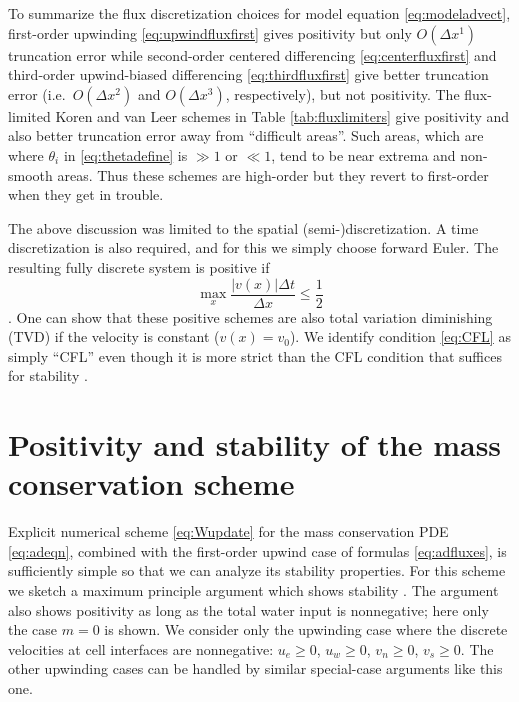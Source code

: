 \documentclass[11pt,final]{amsart}
\begin{document}
To summarize the flux discretization choices for model equation \eqref{eq:modeladvect}, first-order upwinding \eqref{eq:upwindfluxfirst} gives positivity but only $O(\Delta x^1)$ truncation error while second-order centered differencing \eqref{eq:centerfluxfirst} and third-order upwind-biased differencing \eqref{eq:thirdfluxfirst} give better truncation error (i.e.~$O(\Delta x^2)$ and $O(\Delta x^3)$, respectively), but not positivity.  The flux-limited Koren and van Leer schemes in Table \ref{tab:fluxlimiters} give positivity and also better truncation error away from ``difficult areas''.  Such areas, which are where $\theta_i$ in \eqref{eq:thetadefine} is $\gg 1$ or $\ll 1$, tend to be near extrema and non-smooth areas.  Thus these schemes are high-order but they revert to first-order when they get in trouble.

The above discussion was limited to the spatial (semi-)discretization.  A time discretization is also required, and for this we simply choose forward Euler.  The resulting fully discrete system is positive if
\begin{equation}
\max_x \frac{|v(x)|\Delta t}{\Delta x} \le \frac{1}{2} \label{eq:CFL}
\end{equation}
\citep[section III.1.1]{HundsdorferVerwer2010}.  One can show that these positive schemes are also total variation diminishing (TVD) if the velocity is constant ($v(x)=v_0$).  We identify condition \eqref{eq:CFL} as simply ``CFL'' even though it is more strict than the CFL condition that suffices for stability \citep{MortonMayers}.


\section{Positivity and stability of the mass conservation scheme} \label{app:positivestable}

Explicit numerical scheme \eqref{eq:Wupdate} for the mass conservation PDE \eqref{eq:adeqn}, combined with the first-order upwind case of formulas \eqref{eq:adfluxes}, is sufficiently simple so that we can analyze its stability properties.  For this scheme we sketch a maximum principle argument which shows stability \citep{MortonMayers}.  The argument also shows positivity \citep{HundsdorferVerwer2010} as long as the total water input is nonnegative; here only the case $m = 0$ is shown.  We consider only the upwinding case where the discrete velocities at cell interfaces are nonnegative: $u_e\ge 0$, $u_w\ge 0$, $v_n\ge 0$, $v_s\ge 0$.  The other upwinding cases can be handled by similar special-case arguments like this one.
\end{document}
